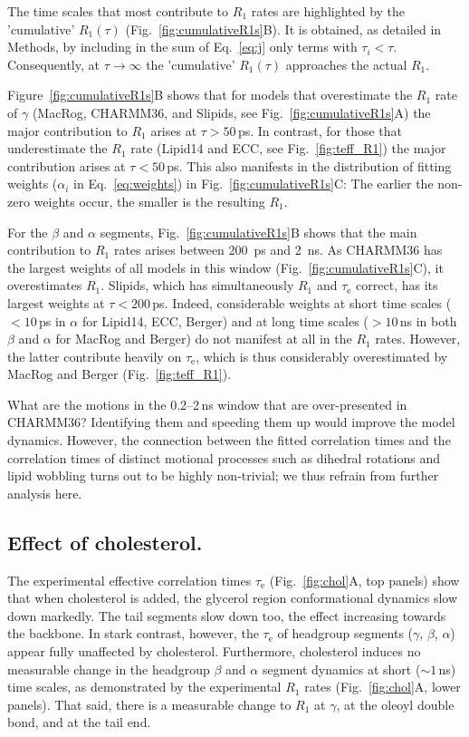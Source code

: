 \documentclass[journal=jpcbfk,manuscript=article,layout=twocolumn]{achemso}
\begin{document}
The time scales that most contribute to $R_1$ rates are highlighted by the
'cumulative' $R_1(\tau)$ (Fig.~\ref{fig:cumulativeR1s}B).
It is obtained, as detailed in Methods,
by including in the sum of Eq.~\eqref{eq:j} only terms with $\tau_i<\tau$.
Consequently, at $\tau\to\infty$ the 'cumulative' $R_1(\tau)$ approaches the actual $R_1$.

Figure~\ref{fig:cumulativeR1s}B shows
that for models that overestimate the $R_1$ rate of $\gamma$
(MacRog, CHARMM36, and Slipids, see Fig.~\ref{fig:cumulativeR1s}A)
the major contribution to $R_1$ arises at $\tau>50$\,ps.
In contrast, for those that underestimate the $R_1$ rate
(Lipid14 and ECC, see Fig.~\ref{fig:teff_R1})
the major contribution arises at $\tau<50$\,ps.
%
This also manifests in the
distribution of fitting weights ($\alpha_i$ in Eq.~\eqref{eq:weights}) in Fig.~\ref{fig:cumulativeR1s}C:
The earlier the non-zero weights occur, the smaller is the resulting $R_1$.

For the $\beta$ and $\alpha$ segments, Fig.~\ref{fig:cumulativeR1s}B shows
that the main contribution to $R_1$ rates arises
between 200~ps and 2~ns.
%
As CHARMM36 has the largest weights of all models in this window (Fig.~\ref{fig:cumulativeR1s}C),
it overestimates $R_1$.
%
Slipids, which has simultaneously $R_1$ and $\tau_\mathrm e$ correct,
has its largest weights at $\tau<200$\,ps.
%
Indeed, considerable weights
at short time scales ($<10$\,ps in $\alpha$ for Lipid14, ECC, Berger) and
at long time scales ($>10$\,ns in both $\beta$ and $\alpha$ for MacRog and Berger)
do not manifest at all in the $R_1$ rates.
%
However, the latter contribute heavily on $\tau_\mathrm e$,
which is thus considerably overestimated by MacRog and Berger (Fig.~\ref{fig:teff_R1}).

What are the motions in the 0.2--2\,ns window that are over-presented in CHARMM36?
Identifying them and speeding them up would improve the model dynamics.
However, the connection between the fitted correlation times and the correlation times of distinct motional processes such as dihedral rotations and lipid wobbling turns out to be highly non-trivial; we thus refrain from further analysis here.

\clearpage
\newpage

\subsection*{Effect of cholesterol.}
The experimental effective correlation times $\tau_\mathrm e$
(Fig.~\ref{fig:chol}A, top panels)
show that when cholesterol is added,
the glycerol region conformational dynamics
slow down markedly.
%
The tail segments slow down too,
the effect increasing towards the backbone.
In stark contrast, however,
the $\tau_\mathrm e$ of headgroup segments ($\gamma$, $\beta$, $\alpha$)
appear fully unaffected by cholesterol.
%
Furthermore, cholesterol induces no measurable change in the
headgroup $\beta$ and $\alpha$ segment
dynamics at short ($\sim1$\,ns) time scales, as
demonstrated by
the experimental $R_{1}$ rates (Fig.~\ref{fig:chol}A, lower panels).
That said,
there is a measurable change to $R_1$ at $\gamma$,
at the oleoyl double bond, and at the tail end.
\end{document}
